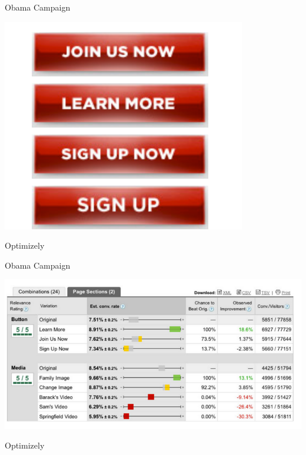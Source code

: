 \documentclass{beamer}
\begin{document}
\begin{frame}{Obama Campaign}

\begin{center}
\includegraphics[scale=0.5]{pics/wk6/Obama_buttons.png}
\end{center}

Optimizely

\end{frame}


\begin{frame}{Obama Campaign}

\begin{center}
\includegraphics[scale=0.45]{pics/wk6/Obama_results.png}
\end{center}

Optimizely

\end{frame}
\end{document}
